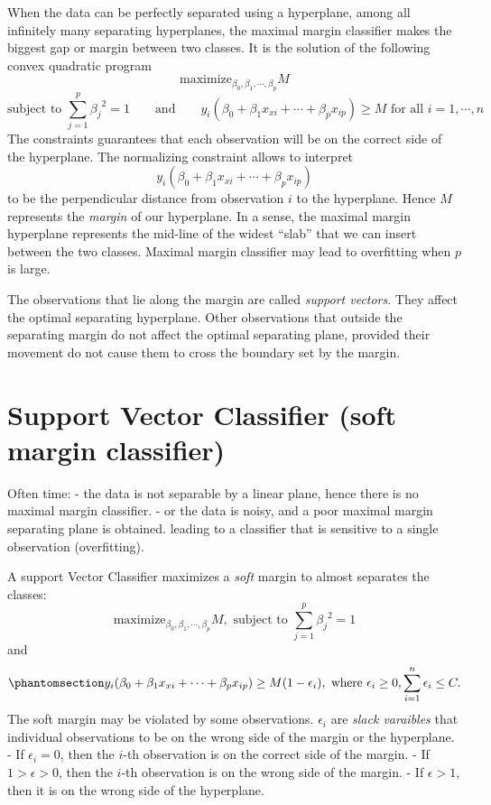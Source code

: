 \documentclass[
  letterpaper,
  DIV=11,
  numbers=noendperiod]{scrreprt}
\begin{document}
When the data can be perfectly separated using a hyperplane, among all
infinitely many separating hyperplanes, the maximal margin classifier
makes the biggest gap or margin between two classes. It is the solution
of the following convex quadratic program \[
\text{maximize}_{\beta_0, \beta_1, \cdots, \beta_p}M
\] \[
\text{subject to } \sum_{j=1}^p {\beta_j}^2 =1\qquad \text{and}\qquad y_i(\beta_0+\beta_1x_{xi}+\cdots + \beta_px_{ip})\ge M \text{ for all }i=1, \cdots, n
\] The constraints guarantees that each observation will be on the
correct side of the hyperplane. The normalizing constraint allows to
interpret \[
y_i(\beta_0+\beta_1x_{xi}+\cdots + \beta_px_{ip})
\] to be the perpendicular distance from observation \(i\) to the
hyperplane. Hence \(M\) represents the \emph{margin} of our hyperplane.
In a sense, the maximal margin hyperplane represents the mid-line of the
widest ``slab'' that we can insert between the two classes. Maximal
margin classifier may lead to overfitting when \(p\) is large.

The observations that lie along the margin are called \emph{support
vectors}. They affect the optimal separating hyperplane. Other
observations that outside the separating margin do not affect the
optimal separating plane, provided their movement do not cause them to
cross the boundary set by the margin.

\section{Support Vector Classifier (soft margin
classifier)}\label{support-vector-classifier-soft-margin-classifier}

Often time: - the data is not separable by a linear plane, hence there
is no maximal margin classifier. - or the data is noisy, and a poor
maximal margin separating plane is obtained. leading to a classifier
that is sensitive to a single observation (overfitting).

A support Vector Classifier maximizes a \emph{soft} margin to almost
separates the classes: \[
\text{maximize}_{\beta_0, \beta_1, \cdots, \beta_p}M, \text{ subject to } \sum_{j=1}^p {\beta_j}^2 =1
\] and \begin{equation}\phantomsection\label{eq-svc}{
y_i(\beta_0+\beta_1x_{xi}+\cdots + \beta_px_{ip})\ge M(1-\epsilon_i), \text{ where } \epsilon_i\ge 0, \sum_{i=1}^n \epsilon_i \le C.
}\end{equation} The soft margin may be violated by some observations.
\(\epsilon_i\) are \emph{slack varaibles} that individual observations
to be on the wrong side of the margin or the hyperplane. - If
\(\epsilon_i=0\), then the \(i\)-th observation is on the correct side
of the margin. - If \(1>\epsilon>0\), then the \(i\)-th observation is
on the wrong side of the margin. - If \(\epsilon >1\), then it is on the
wrong side of the hyperplane.
\end{document}
